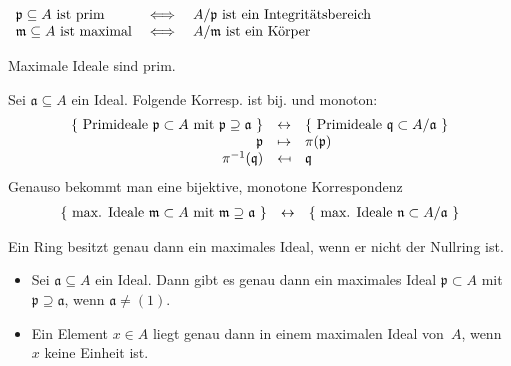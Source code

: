\documentclass{cheat-sheet}
\newcommand{\aaa}{\mathfrak{a}}
\newcommand{\ppp}{\mathfrak{p}}
\newcommand{\qqq}{\mathfrak{q}}
\newcommand{\mmm}{\mathfrak{m}}
\newcommand{\nnn}{\mathfrak{n}}
\begin{document}
\begin{lem}
  \begin{minipage}[t]{0.85 \linewidth}
    $
      \begin{array}[t]{l c l}
        \text{$\ppp \subseteq A$ ist prim} & \iff & \text{$A/\ppp$ ist ein Integritätsbereich} \\
        \text{$\mmm \subseteq A$ ist maximal} & \iff & \text{$A/\mmm$ ist ein Körper} \\
      \end{array}
    $
  \end{minipage}
\end{lem}

\begin{kor}
  Maximale Ideale sind prim.
\end{kor}

\begin{prop}
  Sei $\aaa \subseteq A$ ein Ideal.
  Folgende Korresp. ist bij. und monoton:
  \[
    \begin{array}{r c l}
      \{ \text{ Primideale $\ppp \subset A$ mit $\ppp \supseteq \aaa$ } \} & \leftrightarrow & \{ \text{ Primideale $\qqq \subset A/\aaa$ } \} \\
      \ppp & \mapsto & \pi(\ppp) \\
      \pi^{-1}(\qqq) & \mapsfrom & \qqq
    \end{array}
  \]
  Genauso bekommt man eine bijektive, monotone Korrespondenz
  \[
    \begin{array}{r c l}
      \{ \text{ max. Ideale $\mmm \subset A$ mit $\mmm \supseteq \aaa$ } \} & \leftrightarrow & \{ \text{ max. Ideale $\nnn \subset A/\aaa$ } \}
    \end{array}
  \]
\end{prop}


\begin{prop}
  Ein Ring besitzt genau dann ein maximales Ideal, wenn er nicht der Nullring ist.
\end{prop}

\begin{kor}
  \begin{itemize}
    \item Sei $\aaa \subseteq A$ ein Ideal.
    Dann gibt es genau dann ein maximales Ideal $\ppp \subset A$ mit $\ppp \supseteq \aaa$, wenn $\aaa \neq (1)$.
    \item Ein Element $x \in A$ liegt genau dann in einem maximalen Ideal von~$A$, wenn~$x$ keine Einheit ist.
  \end{itemize}
\end{kor}
\end{document}
